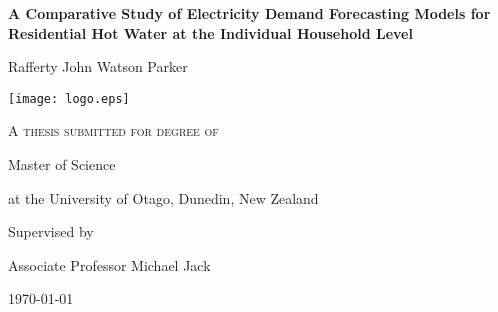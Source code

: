 
	\frontmatter
	\begin{titlepage}
		\centering
		{\huge\bfseries A Comparative Study of Electricity Demand Forecasting Models for Residential Hot Water at the Individual Household Level\par}
		\vspace{1cm}
		{\huge Rafferty John Watson Parker\par}
		\vspace{1cm}
		\vspace{1cm}
		\texttt{[image: logo.eps]}\par\vspace{1cm}
		\vspace{1cm}
		{\scshape A thesis submitted for degree of\par
			\Large Master of Science\par
			\large at the University of Otago, Dunedin, New Zealand\par}
		\vfill
		Supervised by\par
		\large Associate Professor Michael Jack
		
		\vfill
		
		{\large \today\par}
	\end{titlepage}
